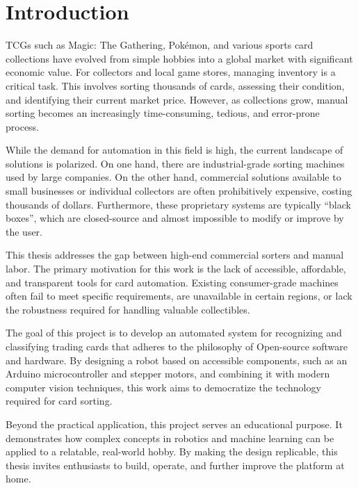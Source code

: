 
\chapter{Introduction\label{chap:introduction}}

\acp{TCG} such as Magic: The Gathering, Pokémon, and various sports card collections have evolved from 
simple hobbies into a global market with significant economic value. For collectors and local game stores, managing 
inventory is a critical task. This involves sorting thousands of cards, assessing their condition, and identifying their 
current market price. However, as collections grow, manual sorting becomes an increasingly time-consuming, tedious, and 
error-prone process.

While the demand for automation in this field is high, the current landscape of solutions is polarized. On one hand, 
there are industrial-grade sorting machines used by large companies. On the other hand, commercial solutions available 
to small businesses or individual collectors are often prohibitively expensive, costing thousands of dollars. 
Furthermore, these proprietary systems are typically \enquote{black boxes}, which are closed-source and almost 
impossible to modify or improve by the user.

This thesis addresses the gap between high-end commercial sorters and manual labor. The primary motivation for this work 
is the lack of accessible, affordable, and transparent tools for card automation. Existing consumer-grade machines often 
fail to meet specific requirements, are unavailable in certain regions, or lack the robustness required for handling 
valuable collectibles.

The goal of this project is to develop an automated system for recognizing and classifying trading cards that adheres to 
the philosophy of Open-source software and hardware. By designing a robot based on accessible components, such as an 
Arduino microcontroller and stepper motors, and combining it with modern computer vision techniques, this work aims to 
democratize the technology required for card sorting.

Beyond the practical application, this project serves an educational purpose. It demonstrates how complex concepts in 
robotics and machine learning can be applied to a relatable, real-world hobby. By making the design replicable, this 
thesis invites enthusiasts to build, operate, and further improve the platform at home.

